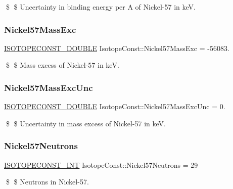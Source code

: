 \$ \$ Uncertainty in binding energy per A of Nickel-\/57 in keV. \mbox{\label{group___isotope_const-_nickel-_ni57_ga0dab1af68f207e6ac1aa89e34ec4941d}} 
\subsubsection{\texorpdfstring{Nickel57\+Mass\+Exc}{Nickel57MassExc}}
{\footnotesize\ttfamily \mbox{\hyperlink{group___isotope_const-_macros_ga8f45a7272ce02c0b4c65c44636ed719a}{I\+S\+O\+T\+O\+P\+E\+C\+O\+N\+S\+T\+\_\+\+D\+O\+U\+B\+LE}} Isotope\+Const\+::\+Nickel57\+Mass\+Exc = -\/56083.}

\$ \$ Mass excess of Nickel-\/57 in keV. \mbox{\label{group___isotope_const-_nickel-_ni57_gadf227e62a16992526ae53032d45f7de4}} 
\subsubsection{\texorpdfstring{Nickel57\+Mass\+Exc\+Unc}{Nickel57MassExcUnc}}
{\footnotesize\ttfamily \mbox{\hyperlink{group___isotope_const-_macros_ga8f45a7272ce02c0b4c65c44636ed719a}{I\+S\+O\+T\+O\+P\+E\+C\+O\+N\+S\+T\+\_\+\+D\+O\+U\+B\+LE}} Isotope\+Const\+::\+Nickel57\+Mass\+Exc\+Unc = 0.}

\$ \$ Uncertainty in mass excess of Nickel-\/57 in keV. \mbox{\label{group___isotope_const-_nickel-_ni57_ga7d5836e0cffe3bade9d12c894a850736}} 
\subsubsection{\texorpdfstring{Nickel57\+Neutrons}{Nickel57Neutrons}}
{\footnotesize\ttfamily \mbox{\hyperlink{group___isotope_const-_macros_ga5f18360b3e99483a35c32d789e62621c}{I\+S\+O\+T\+O\+P\+E\+C\+O\+N\+S\+T\+\_\+\+I\+NT}} Isotope\+Const\+::\+Nickel57\+Neutrons = 29}

\$ \$ Neutrons in Nickel-\/57. \mbox{\label{group___isotope_const-_nickel-_ni57_gab4997ad686081fd2b69eddef45b53642}} 
